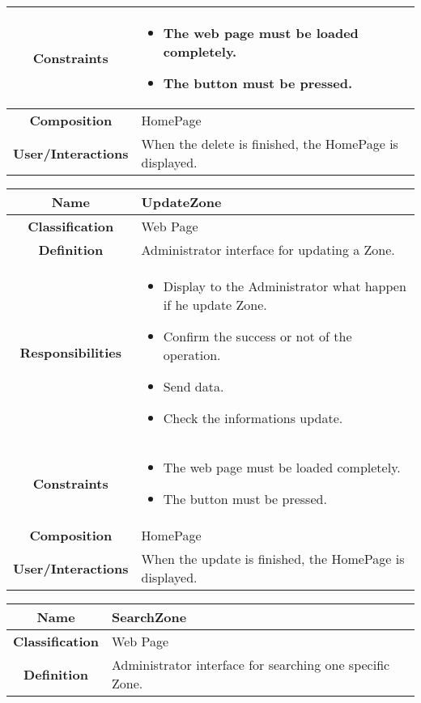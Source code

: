 \documentclass[11pt, a4paper,titlepage]{article}
\begin{document}
\begin{enumerate}
\begin{tabularx}{\textwidth}{| c | X |}
	\\
	\hline
	\textbf{Constraints} &
	\begin{itemize}
		\item  The web page must be loaded completely.
		\item The button must be pressed.
	\end{itemize}
	\\
	\hline
	\textbf{Composition} & HomePage
	\\
	\hline
	\textbf{User/Interactions} &
	When the delete is finished, the HomePage is displayed.
	\\
	\hline 
\end{tabularx}
\begin{tabularx}{\textwidth}{| c | X |}
	\hline
	\textbf{Name} &
	UpdateZone
	\\
	\hline
	\textbf{Classification} &
	Web Page
	\\
	\hline
	\textbf{Definition} &
	Administrator interface for updating a Zone.\\
	\hline
	\textbf{Responsibilities} &
	\begin{itemize}
		\item Display to the Administrator what happen if he update Zone.
		\item Confirm the success or not of the operation.
		\item Send data.
		\item Check the informations update.
	\end{itemize}
	\\
	\hline
	\textbf{Constraints} &
	\begin{itemize}
		\item  The web page must be loaded completely.
		\item The button must be pressed.
	\end{itemize}
	\\
	\hline
	\textbf{Composition} & HomePage
	\\
	\hline
	\textbf{User/Interactions} &
	When the update is finished, the HomePage is displayed.
	\\
	\hline 
\end{tabularx}
\begin{tabularx}{\textwidth}{| c | X |}
	\hline
	\textbf{Name} &
	SearchZone
	\\
	\hline
	\textbf{Classification} &
	Web Page
	\\
	\hline
	\textbf{Definition} &
	Administrator interface for searching one specific Zone.\\

\end{tabularx}
\end{enumerate}
\end{document}
